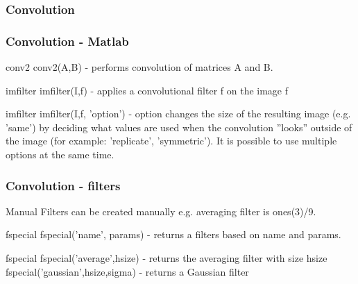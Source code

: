 \documentclass{beamer}
\begin{document}
\begin{frame}
\frametitle{Convolution}
\noindent{}
\end{frame}

\begin{frame}
\frametitle{Convolution - Matlab}
\begin{block}{conv2}
conv2(A,B) - performs convolution of matrices A and B.
\end{block}

\begin{block}{imfilter}
imfilter(I,f) - applies a convolutional filter f on the image f
\end{block}

\begin{block}{imfilter}
imfilter(I,f, 'option') - option changes the size of the resulting image (e.g. 'same') by deciding what values are used when the convolution ''looks'' outside of the image (for example: 'replicate', 'symmetric'). It is possible to use multiple options at the same time.
\end{block}
\end{frame}

\begin{frame}
\frametitle{Convolution - filters}
\begin{block}{Manual}
Filters can be created manually e.g. averaging filter is ones(3)/9.
\end{block}

\begin{block}{fspecial}
fspecial('name', params) - returns a filters based on name and params.
\end{block}

\begin{block}{fspecial}
fspecial('average',hsize) - returns the averaging filter with size hsize \\
fspecial('gaussian',hsize,sigma) - returns a Gaussian filter
\end{block}
\end{frame}
\end{document}

